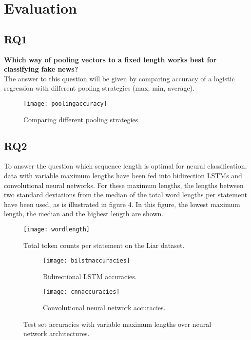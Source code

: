 \section{Evaluation}

\subsection{RQ1}
\textbf{Which way of pooling vectors to a fixed length works best for classifying fake news?}\\
The answer to this question will be given by comparing accuracy of a logistic regression with different pooling strategies (max, min, average).

\begin{figure}[h]
    \centering
    \texttt{[image: poolingaccuracy]}
    \caption{Comparing different pooling strategies.}
\end{figure}

\subsection{RQ2}
To answer the question which sequence length is optimal for neural classification, data with variable maximum lengths have been fed into bidirection LSTMs and convolutional neural networks.
For these maximum lengths, the lengths between two standard deviations from the median of the total word lengths per statement have been used, as is illustrated in figure 4. 
In this figure, the lowest maximum length, the median and the highest length are shown.

\begin{figure}
    \centering
    \texttt{[image: wordlength]}
    \caption{Total token counts per statement on the Liar dataset.}
\end{figure}

\begin{figure}[h]
    \centering
    \begin{subfigure}[b]{1\textwidth}
       \texttt{[image: bilstmaccuracies]}
       \caption{Bidirectional LSTM accuracies.}
    \end{subfigure}
    
    \begin{subfigure}[b]{1\textwidth}
       \texttt{[image: cnnaccuracies]}
       \caption{Convolutional neural network accuracies.}
    \end{subfigure}
    
    \caption{Test set accuracies with variable maximum lengths over neural network architectures.}
\end{figure}

